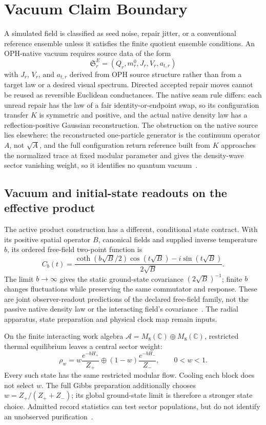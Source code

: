 \documentclass[11pt]{article}
\theoremstyle{remark}
\theoremstyle{plain}
\begin{document}
\section{Vacuum Claim Boundary}
\label{sec:vacuum-claim-boundary}

A simulated field is classified as seed noise, repair jitter, or a conventional
reference ensemble unless it satisfies the finite quotient ensemble
conditions. An OPH-native vacuum requires source data of the form
\[
\mathfrak S_r^E=(Q_r,m_r^0,J_r,V_r,a_{t,r})
\]
with \(J_r\), \(V_r\), and \(a_{t,r}\) derived from OPH source structure rather than from a target
law or a desired visual spectrum. Directed accepted repair moves cannot be
reused as reversible Euclidean conductances. The native seam rule differs:
each unread repair has the law of a fair identity-or-endpoint swap, so its
configuration transfer \(K\) is symmetric and positive, and the actual native
density law has a reflection-positive Gaussian reconstruction. The
obstruction on the native source lies elsewhere: the reconstructed
one-particle generator is the
continuum operator \(A\), not \(\sqrt A\), and the full configuration return
reference built from \(K\) approaches the normalized trace at fixed modular
parameter and gives the density-wave sector vanishing weight, so it
identifies no quantum vacuum~\cite{ophtimefields}.

\subsection{Vacuum and initial-state readouts on the effective product}

The active product construction has a different, conditional state contract.
With its positive spatial operator \(B\), canonical fields and supplied
inverse temperature \(b\), its ordered free-field two-point function is
\[
 C_b(t)=\frac{\coth(b\sqrt B/2)\cos(t\sqrt B)
                   -i\sin(t\sqrt B)}{2\sqrt B}.
\]
The limit \(b\to\infty\) gives the static ground-state covariance
\((2\sqrt B)^{-1}\); finite \(b\) changes fluctuations while preserving the
same commutator and response. These are joint observer-readout predictions
of the declared free-field family, not the passive native density law or
the interacting field's covariance~\cite{ophtimefields}.
The radial apparatus, state preparation and physical clock map remain inputs.

On the finite interacting work algebra
\(\mathcal A=M_8(\mathbb C)\oplus M_8(\mathbb C)\), restricted thermal
equilibrium leaves a central sector weight:
\[
 \rho_w=w\frac{e^{-bH_+}}{Z_+}\oplus
        (1-w)\frac{e^{-bH_-}}{Z_-},\qquad 0<w<1.
\]
Every such state has the same restricted modular flow. Cooling each block
does not select \(w\). The full Gibbs preparation additionally chooses
\(w=Z_+/(Z_++Z_-)\); its global ground-state limit is therefore a stronger
state choice. Admitted record statistics can test sector populations,
but do not identify an unobserved purification~\cite{ophproduct}.
\end{document}
